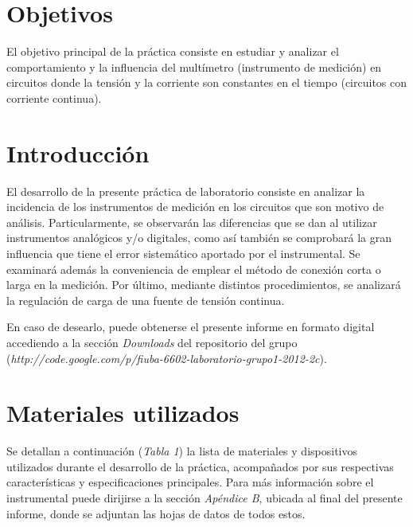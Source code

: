 \documentclass{article}
\begin{document}
\section{Objetivos}

	El objetivo principal de la práctica consiste en estudiar y analizar el comportamiento y la influencia del multímetro (instrumento de medición) en circuitos donde la tensión y la corriente son constantes en el tiempo (circuitos con corriente continua).  
\bigskip



\section{Introducción}

	El desarrollo de la presente práctica de laboratorio consiste en analizar la incidencia de los instrumentos de medición en los circuitos que son motivo de análisis. Particularmente, se observarán las diferencias que se dan al utilizar instrumentos analógicos y/o digitales, como así también se comprobará la gran influencia que tiene el error sistemático aportado por el instrumental. Se examinará además la conveniencia de emplear el método de conexión corta o larga en la medición. Por último, mediante distintos procedimientos, se analizará la regulación de carga de una fuente de tensión continua.
	\par
	En caso de desearlo, puede obtenerse el presente informe en formato digital accediendo a la sección \textit{Downloads} del repositorio del grupo (\textit{http://code.google.com/p/fiuba-6602-laboratorio-grupo1-2012-2c}).

\bigskip




\section{Materiales utilizados}

	Se detallan a continuación (\textit{Tabla 1}) la lista de materiales y dispositivos utilizados durante el desarrollo de la práctica, acompañados por sus respectivas características y especificaciones principales. Para más información sobre el instrumental puede dirijirse a la sección \textit{Apéndice B}, ubicada al final del presente informe, donde se adjuntan las hojas de datos de todos estos.
\bigskip\bigskip
\end{document}
